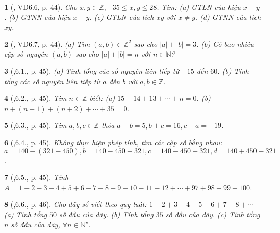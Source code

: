 \documentclass{article}
\newtheorem{baitoan}{}
\begin{document}
\begin{baitoan}[\cite{TLCT_THCS_Toan_6_so_hoc}, VD6.6, p. 44]
	Cho $x,y\in\mathbb{Z},-35\le x,y\le28$. Tìm: (a) {\rm GTLN} của hiệu $x - y$. (b) {\rm GTNN} của hiệu $x - y$. (c) {\rm GTLN} của tích $xy$ với $x\ne y$. (d) {\rm GTNN} của tích $xy$.
\end{baitoan}

\begin{baitoan}[\cite{TLCT_THCS_Toan_6_so_hoc}, VD6.7, p. 44]
	(a) Tìm $(a,b)\in\mathbb{Z}^2$ sao cho $|a| + |b| = 3$. (b) Có bao nhiêu cặp số nguyên $(a,b)$ sao cho $|a| + |b| = n$ với $n\in\mathbb{N}$?
\end{baitoan}

\begin{baitoan}[\cite{TLCT_THCS_Toan_6_so_hoc},6.1., p. 45]
	(a) Tính tổng các số nguyên liên tiếp từ $-15$ đến $60$. (b) Tính tổng các số nguyên liên tiếp từ $a$ đến $b$ với $a,b\in\mathbb{Z}$.
\end{baitoan}

\begin{baitoan}[\cite{TLCT_THCS_Toan_6_so_hoc},6.2., p. 45]
	Tìm $n\in\mathbb{Z}$ biết: (a) $15 + 14 + 13 + \cdots + n = 0$. (b) $n + (n + 1) + (n + 2) + \cdots + 35 = 0$.
\end{baitoan}

\begin{baitoan}[\cite{TLCT_THCS_Toan_6_so_hoc},6.3., p. 45]
	Tìm $a,b,c\in\mathbb{Z}$ thỏa $a + b = 5,b + c = 16,c + a = -19$.
\end{baitoan}

\begin{baitoan}[\cite{TLCT_THCS_Toan_6_so_hoc},6.4., p. 45]
	Không thực hiện phép tính, tìm các cặp số bằng nhau: $a = 140 - (321 - 450),b = 140 - 450 - 321,c = 140 - 450 + 321,d = 140 + 450 - 321$.
\end{baitoan}

\begin{baitoan}[\cite{TLCT_THCS_Toan_6_so_hoc},6.5., p. 45]
	Tính $A = 1 + 2 - 3 - 4 + 5 + 6 - 7 - 8 + 9 + 10 - 11 - 12 + \cdots + 97 + 98 - 99 - 100$.
\end{baitoan}

\begin{baitoan}[\cite{TLCT_THCS_Toan_6_so_hoc},6.6., p. 46]
	Cho dãy số viết theo quy luật: $1 - 2 + 3 - 4 + 5 - 6 + 7 - 8 + \cdots$ (a) Tính tổng $50$ số đầu của dãy. (b) Tính tổng $35$ số đầu của dãy. (c) Tính tổng $n$ số đầu của dãy, $\forall n\in\mathbb{N}^\star$.
\end{baitoan}
\end{document}
